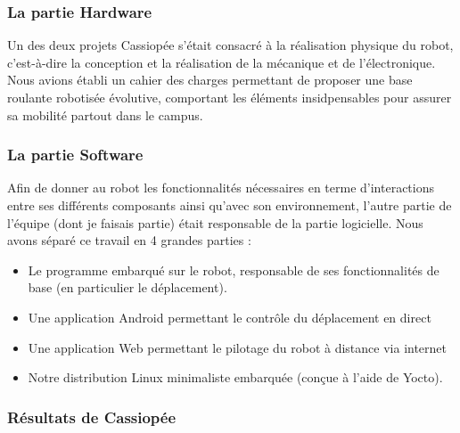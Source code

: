 \documentclass{report}
\begin{document}
     \subsubsection{La partie Hardware}

     {Un des deux projets Cassiopée s'était consacré à la réalisation physique
     du robot, c'est-à-dire la conception et la réalisation de la mécanique et
     de l'électronique. Nous avions établi un cahier des charges permettant de
    proposer une base roulante robotisée évolutive, comportant les éléments
    insidpensables pour assurer sa mobilité partout dans le campus.}

    \subsubsection{La partie Software}

    {Afin de donner au robot les fonctionnalités nécessaires en terme d'interactions
    entre ses différents composants ainsi qu'avec son environnement, l'autre partie
    de l'équipe (dont je faisais partie) était responsable de la partie logicielle.
    Nous avons séparé ce travail en 4 grandes parties :}
    \begin{itemize}
      \item Le programme embarqué sur le robot, responsable de ses
      fonctionnalités de base (en particulier le déplacement).
      \item Une application Android permettant le contrôle du déplacement en direct
      \item Une application Web permettant le pilotage du robot à distance via internet
      \item Notre distribution Linux minimaliste embarquée (conçue à l'aide de Yocto).
      \newline
    \end{itemize}

    \subsubsection{Résultats de Cassiopée}
\end{document}
